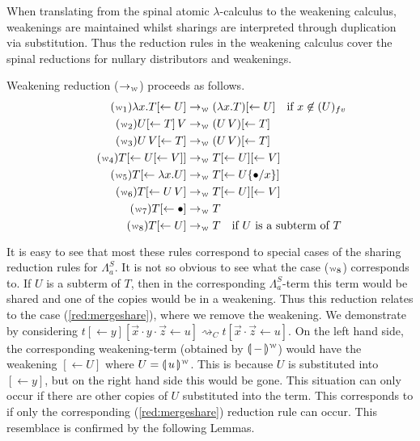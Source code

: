 \documentclass[a4paper,UKenglish,cleveref, autoref]{lipics-v2019}
\newcommand{\FALC}{\Lambda^{S}_{a}}
\newcommand{\fv}[1]{(#1)_{fv}}
\newcommand{\abs}[2]{\lambda #1 . #2}
\newcommand{\app}[2]{#1 \, #2}
\newcommand{\share}[3]{#1 [#2 \leftarrow #3]}
\newcommand{\sub}[3]{#1 \{ #2 / #3 \}}
\newcommand{\weaksymbol}{\mbox{\tiny $\mathcal{W}$}}
\newcommand{\compweak}[1]{\llparenthesis \, #1 \, \rrparenthesis^{\weaksymbol}}
\begin{document}
When translating from the spinal atomic $\lambda$-calculus to the weakening calculus, weakenings are maintained whilst sharings are interpreted through duplication via substitution. Thus the reduction rules in the weakening calculus cover the spinal reductions for nullary distributors and weakenings.

\begin{definition}
Weakening reduction ($\rightarrow_{\weaksymbol}$) proceeds as follows.
\begingroup
\allowdisplaybreaks
\begin{align*}
	\tag{$\weaksymbol_{1}$}
	\abs{x}{\share{T}{}{U}} &\rightarrow_{\weaksymbol} (\abs{x}{T})\share{}{}{U} \quad \text{if } x \not\in \fv{U} \\
	\tag{$\weaksymbol_{2}$}
	\app{\share{U}{}{T}}{V} &\rightarrow_{\weaksymbol} (\app{U}{V}) \share{}{}{T} \\
	\tag{$\weaksymbol_{3}$}
	\app{U}{\share{V}{}{T}} &\rightarrow_{\weaksymbol} (\app{U}{V}) \share{}{}{T} \\
	\tag{$\weaksymbol_{4}$}
	\share{T}{}{\share{U}{}{V}} &\rightarrow_{\weaksymbol} \share{T}{}{U} \share{}{}{V} \\
	\tag{$\weaksymbol_{5}$}
	\share{T}{}{\abs{x}{U}} &\rightarrow_{\weaksymbol} \share{T}{}{U \sub{}{\bullet}{x}} \\
	\tag{$\weaksymbol_{6}$}
	\share{T}{}{\app{U}{V}} &\rightarrow_{\weaksymbol} T \share{}{}{U} \share{}{}{V} \\
	\tag{$\weaksymbol_{7}$}
	\share{T}{}{\bullet} &\rightarrow_{\weaksymbol} T \\
	\tag{$\weaksymbol_{8}$}
	\share{T}{}{U} &\rightarrow_{\weaksymbol} T \quad \text{if $U$ is a subterm of $T$}
\end{align*}
\endgroup
\end{definition}
\noindent It is easy to see that most these rules correspond to special cases of the sharing reduction rules for $\FALC$. It is not so obvious to see what the case ($\weaksymbol_{8}$) corresponds to. If $U$ is a subterm of $T$, then in the corresponding $\FALC$-term this term would be shared and one of the copies would be in a weakening. Thus this reduction relates to the case (\ref{red:mergeshare}), where we remove the weakening. We demonstrate by considering $t \share{}{}{y} \share{}{\vec{x} \cdot y \cdot \vec{z}}{u}  \rightsquigarrow_{C} t \share{}{\vec{x} \cdot \vec{z}}{u}$. On the left hand side, the corresponding weakening-term (obtained by $\compweak{-}$) would have the weakening $\share{}{}{U}$ where $U = \compweak{u}$. This is because $U$ is substituted into $\share{}{}{y}$, but on the right hand side this would be gone. This situation can only occur if there are other copies of $U$ substituted into the term. This corresponds to if only the corresponding (\ref{red:mergeshare}) reduction rule can occur. This resemblace is confirmed by the following Lemmas.
\end{document}
